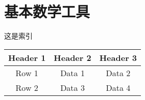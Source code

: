 

\appendix

\chapter{基本数学工具}


这是索引











\begin{table}[htb]
    \centering
        \begin{tabular}{ccc}
            \toprule
                 Header 1 & Header 2 & Header 3 \\
            \midrule
                Row 1    & Data 1   & Data 2   \\
                Row 2    & Data 3   & Data 4   \\
            \bottomrule
        \end{tabular}
\end{table}